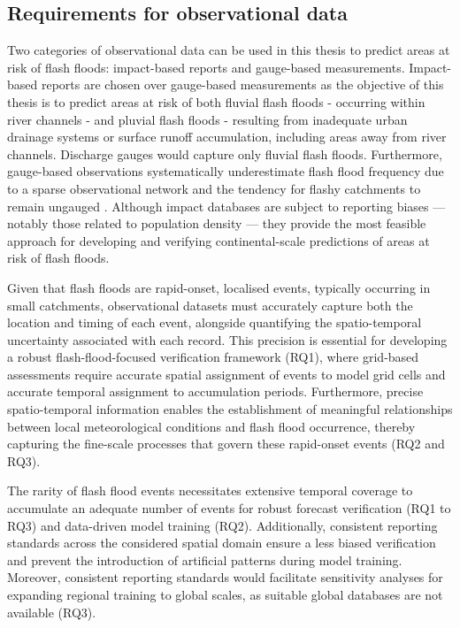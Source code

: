 \subsection{Requirements for observational data}

Two  categories of observational data can be used in this thesis to predict areas at risk of flash floods: impact-based reports and gauge-based measurements. Impact-based reports are chosen over gauge-based measurements as the objective of this thesis is to predict areas at risk of both fluvial flash floods - occurring within river channels - and pluvial flash floods - resulting from inadequate urban drainage systems or surface runoff accumulation, including areas away from river channels. Discharge gauges would capture only fluvial flash floods. Furthermore, gauge-based observations systematically underestimate flash flood frequency due to a sparse observational network and the tendency for flashy catchments to remain ungauged \citep{Gaume_2009, Gaume_2016}. Although impact databases are subject to reporting biases — notably those related to population density \citep{Marjerison_2016} — they provide the most feasible approach for developing and verifying continental-scale predictions of areas at risk of flash floods.

Given  that flash floods are rapid-onset, localised events, typically occurring in small catchments, observational datasets must accurately capture both the location and timing of each event, alongside quantifying the spatio-temporal uncertainty associated with each record. This precision is essential for developing a robust flash-flood-focused verification framework (RQ1), where grid-based assessments require accurate spatial assignment of events to model grid cells and accurate temporal assignment to accumulation periods. Furthermore, precise spatio-temporal information enables the establishment of meaningful relationships between local meteorological conditions and flash flood occurrence, thereby capturing the fine-scale processes that govern these rapid-onset events (RQ2 and RQ3).

The  rarity of flash flood events necessitates extensive temporal coverage to accumulate an adequate number of events for robust forecast verification (RQ1 to RQ3) and data-driven model training (RQ2). Additionally, consistent reporting standards across the considered spatial domain ensure a less biased verification and prevent the introduction of artificial patterns during model training. Moreover, consistent reporting standards would facilitate sensitivity analyses for expanding regional training to global scales, as suitable global databases are not available (RQ3).

